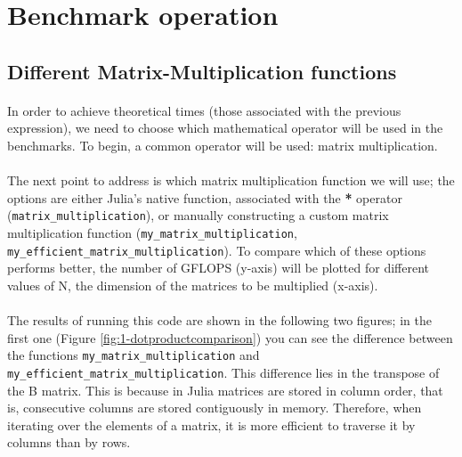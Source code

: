 \section{Benchmark operation}
\subsection{Different Matrix-Multiplication functions}

     \paragraph*{}
     In order to achieve theoretical times (those associated with the previous expression), we need to 
     choose which mathematical operator will be used in the benchmarks. To begin, a common operator 
     will be used: matrix multiplication.

     \paragraph{}
     The next point to address is which matrix multiplication function we will use; the options are 
     either Julia's native function, associated with the \textbf{*} operator (\texttt{matrix\_multiplication}), or manually 
     constructing a custom matrix multiplication function (\texttt{my\_matrix\_multiplication}, \texttt{my\_efficient\_matrix\_multiplication}). To compare which of these options performs better, the number 
     of GFLOPS (y-axis) will be plotted for different values of N, the dimension of the matrices to 
     be multiplied (x-axis).

\vspace*{0.5cm}



\vspace*{1cm}

\paragraph{} The results of running this code are shown in the following two figures; in the first 
one (Figure \ref{fig:1-dotproductcomparison}) you can see the difference between the functions \texttt{my\_matrix\_multiplication} and 
\texttt{my\_efficient\_matrix\_multiplication}. This difference lies in the transpose of the B matrix. 
This is because in Julia matrices are stored in column order, that is, consecutive columns are stored 
contiguously in memory. Therefore, when iterating over the elements of a matrix, it is more efficient 
to traverse it by columns than by rows.

